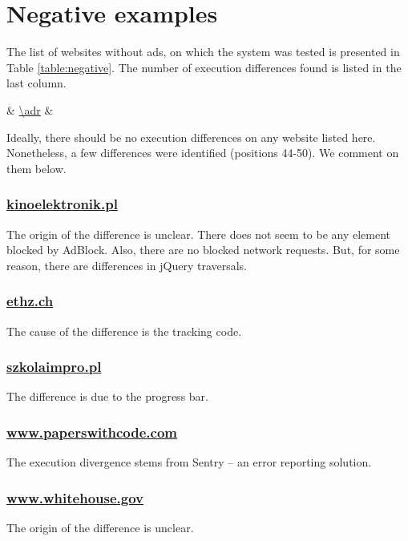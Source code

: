 \section{Negative examples}

The list of websites without ads, on which the system was tested is presented in Table \ref{table:negative}.
The number of execution differences found is listed in the last column.

%
{\thecsvrow & \url{\adr} & \cnt}%

Ideally, there should be no execution differences on any website listed here. Nonetheless, 
a few differences were identified (positions 44-50).
We comment on them below.

\subsubsection{\url{kinoelektronik.pl}}
The origin of the difference is unclear. There does not seem to be any element
blocked by AdBlock. Also, there are no blocked network requests. 
But, for some reason, there are differences in jQuery traversals.

\subsubsection{\url{ethz.ch}}
The cause of the difference is the tracking code.

\subsubsection{\url{szkolaimpro.pl}}
The difference is due to the progress bar.

\subsubsection{\url{www.paperswithcode.com}}
The execution divergence stems from Sentry -- an error reporting solution.

\subsubsection{\url{www.whitehouse.gov}}
The origin of the difference is unclear.

